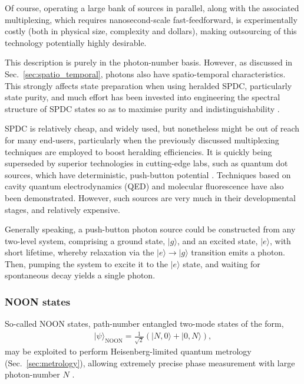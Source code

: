 \documentclass[aps, rmp, twocolumn, amsmath, amssymb, nofootinbib, superscriptaddress, longbibliography, floatfix, table-of-contents, eqsecnum]{revtex4-1}
\newcommand{\ket}[1]{|#1\rangle}
\begin{document}
Of course, operating a large bank of sources in parallel, along with the associated multiplexing, which requires nanosecond-scale fast-feedforward, is experimentally costly (both in physical size, complexity and dollars), making outsourcing of this technology potentially highly desirable.

This description is purely in the photon-number basis. However, as discussed in Sec.~\ref{sec:spatio_temporal}, photons also have spatio-temporal characteristics. This strongly affects state preparation when using heralded SPDC, particularly state purity, and much effort has been invested into engineering the spectral structure of SPDC states so as to maximise purity and indistinguishability \cite{bib:Aichele02, bib:Branning00}.

SPDC is relatively cheap, and widely used, but nonetheless might be out of reach for many end-users, particularly when the previously discussed multiplexing techniques are employed to boost heralding efficiencies. It is quickly being superseded by superior technologies in cutting-edge labs, such as quantum dot sources, which have deterministic, push-button potential \cite{bib:Santori01, bib:Kiraz04}. Techniques based on cavity quantum electrodynamics (QED) \cite{bib:Brattke01} and molecular fluorescence \cite{bib:Brunel99} have also been demonstrated. However, such sources are very much in their developmental stages, and relatively expensive.

Generally speaking, a push-button photon source could be constructed from any two-level system, comprising a ground state, $\ket{g}$, and an excited state, $\ket{e}$, with short lifetime, whereby relaxation via the \mbox{$\ket{e}\to\ket{g}$} transition emits a photon. Then, pumping the system to excite it to the $\ket{e}$ state, and waiting for spontaneous decay yields a single photon.

%
%

\subsubsection{NOON states} \label{sec:NOON} 

So-called NOON states, path-number entangled two-mode states of the form,
\begin{align}
\ket\psi_\text{NOON} = \frac{1}{\sqrt{2}}(\ket{N,0}+\ket{0,N}),
\end{align}
may be exploited to perform Heisenberg-limited quantum metrology (Sec.~\ref{sec:metrology}), allowing extremely precise phase measurement with large photon-number $N$ \cite{bib:Dowling08}. 
\end{document}
